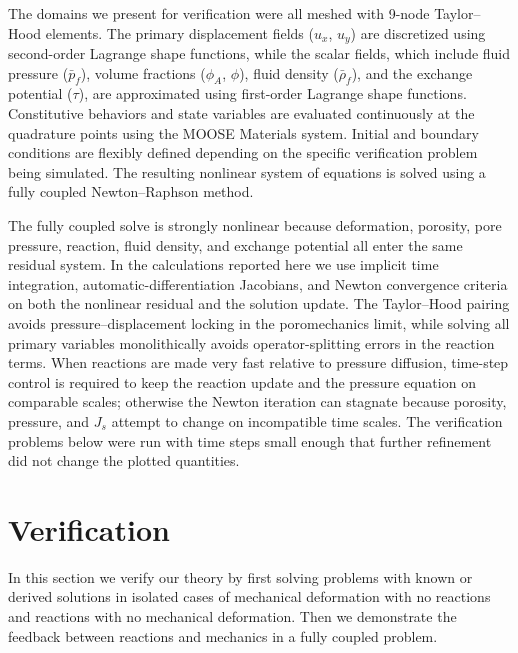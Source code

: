 \documentclass[11pt]{article}
\begin{document}
The domains we present for verification were all meshed with 9-node Taylor--Hood elements. The primary displacement fields ($u_x$, $u_y$) are discretized using second-order Lagrange shape functions, while the scalar fields, which include fluid pressure ($\bar{p}_f$), volume fractions ($\phi_A$, $\phi$), fluid density ($\bar\rho_f$), and the exchange potential ($\tau$), are approximated using first-order Lagrange shape functions. Constitutive behaviors and state variables are evaluated continuously at the quadrature points using the MOOSE Materials system. Initial and boundary conditions are flexibly defined depending on the specific verification problem being simulated. The resulting nonlinear system of equations is solved using a fully coupled Newton--Raphson method.

The fully coupled solve is strongly nonlinear because deformation, porosity, pore pressure, reaction, fluid density, and exchange potential all enter the same residual system.  In the calculations reported here we use implicit time integration, automatic-differentiation Jacobians, and Newton convergence criteria on both the nonlinear residual and the solution update.  The Taylor--Hood pairing avoids pressure--displacement locking in the poromechanics limit, while solving all primary variables monolithically avoids operator-splitting errors in the reaction terms.  When reactions are made very fast relative to pressure diffusion, time-step control is required to keep the reaction update and the pressure equation on comparable scales; otherwise the Newton iteration can stagnate because porosity, pressure, and $J_s$ attempt to change on incompatible time scales.  The verification problems below were run with time steps small enough that further refinement did not change the plotted quantities.

\section{Verification}
\label{sec:verify}

In this section we verify our theory by first solving problems with known or derived solutions in isolated cases of mechanical deformation with no reactions and reactions with no mechanical deformation. Then we demonstrate the feedback between reactions and mechanics in a fully coupled problem.
\end{document}
